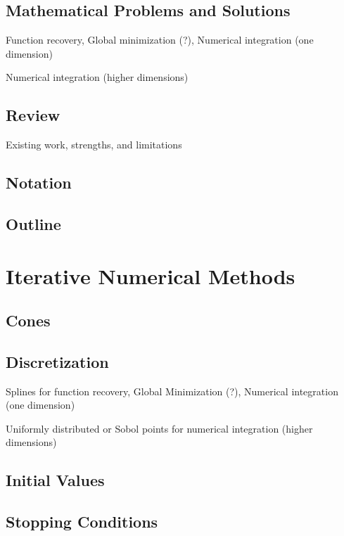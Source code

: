 \documentclass[acmtoms]{doc_acmtrans2m}
\begin{document}
\subsection{Mathematical Problems and Solutions} \label{sec:prob}


Function recovery, Global minimization (?), Numerical integration (one dimension)

Numerical integration (higher dimensions)

\subsection{Review} \label{sec:lit}


Existing work, strengths, and limitations

\subsection{Notation} \label{sec:not}

\subsection{Outline} \label{sec:lit}

\section{Iterative Numerical Methods}
\label{sec:meth}

\subsection{Cones} \label{sec:cones}


\subsection{Discretization} \label{sec:dis}
Splines for function recovery, Global Minimization (?), Numerical integration (one dimension)

Uniformly distributed or Sobol points for numerical integration (higher dimensions)

\subsection{Initial Values}

\subsection{Stopping Conditions}
\end{document}
